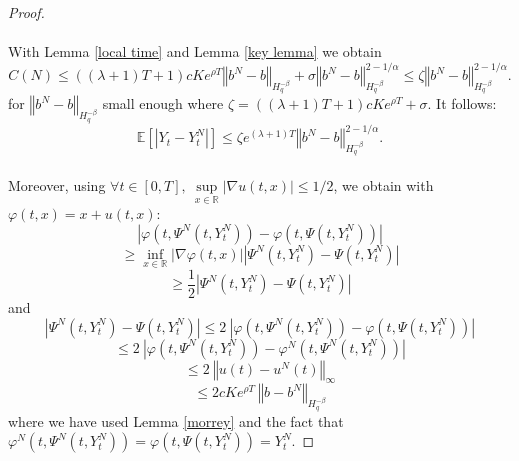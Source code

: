 \documentclass[12pt]{article}
\newcommand{\norme}[1]{\left\Vert #1\right\Vert}
\newcommand{\R}{\mathbb{R}}
\newcommand{\E}{\mathbb{E}}
\begin{document}
\begin{proof}
    \paragraph{}
    With Lemma \ref{local time} and Lemma \ref{key lemma} we obtain \begin{equation*}
    C(N) \leq ((\lambda + 1)T + 1)cKe^{\rho T}\norme{b^N-b}_{H^{-\beta}_{q}} + \sigma\norme{b^N-b}_{H^{-\beta}_{q}}^{2-1/\alpha} \leq \zeta \norme{b^N-b}_{H^{-\beta}_{q}}^{2-1/\alpha}.
    \end{equation*}   
    for $\norme{b^N-b}_{H^{-\beta}_{q}}$ small enough where $\zeta = ((\lambda + 1)T + 1)cKe^{\rho T} + \sigma $. It follows:
    \begin{equation}\label{gronfinal}
    \E\left[\left|Y_t-Y_t^N\right|\right] \leq \zeta e^{(\lambda + 1)T} \norme{b^N-b}_{H^{-\beta}_{q}}^{2-1/\alpha}.
    \end{equation}
    
    \paragraph{}
    Moreover, using $\forall t \in[0,T],\ \underset{x\in\R}{\sup}\left|\nabla u(t,x)\right| \leq 1/2$, we obtain with $\varphi(t,x)=x+u(t,x)$:
    \begin{equation*}
    \left|\varphi\left(t,\Psi^N\left(t,Y_t^N\right)\right)-\varphi\left(t,\Psi\left(t,Y_t^N\right)\right)\right| 
    \end{equation*}
    \begin{equation*}
    \geq \underset{x\in\R}{\inf}\left|\nabla\varphi(t,x)\right|
    \left|\Psi^N\left(t,Y_t^N\right)-\Psi\left(t,Y_t^N\right)\right|
    \end{equation*}
    \begin{equation*}
    \geq \frac{1}{2} \left|\Psi^N\left(t,Y_t^N\right)-\Psi\left(t,Y_t^N\right)\right|
    \end{equation*}    
    and 
    \begin{equation*}
    \left|\Psi^N\left(t,Y_t^N\right)-\Psi\left(t,Y_t^N\right)\right|\leq 2\ \left|\varphi\left(t,\Psi^N\left(t,Y_t^N\right)\right)-\varphi\left(t,\Psi\left(t,Y_t^N\right)\right)\right|
    \end{equation*}   
    \begin{equation*}
    \leq 2\ \left|\varphi\left(t,\Psi^N\left(t,Y_t^N\right)\right)-\varphi^N\left(t,\Psi^N\left(t,Y_t^N\right)\right)\right|
    \end{equation*}   
    \begin{equation*}
    \leq 2\ \norme{u(t)-u^N(t)}_\infty
    \end{equation*} 
    \begin{equation}\label{other}
    \leq 2cKe^{\rho T}\ \norme{b-b^N}_{H^{-\beta}_q}
    \end{equation} 
    where we have used Lemma \ref{morrey} and the fact that $\varphi^N\left(t,\Psi^N\left(t,Y_t^N\right)\right)=\varphi\left(t,\Psi\left(t,Y_t^N\right)\right) = Y_t^N$. 
    

\end{proof}
\end{document}
